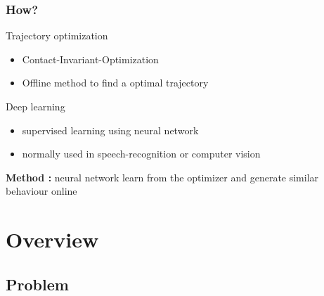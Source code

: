 \documentclass[mathserif]{beamer}
\begin{document}

\begin{frame}
  \frametitle{{How?}}
  \begin{block}{Trajectory optimization}
  \begin{itemize}
  \item Contact-Invariant-Optimization \cite{mordatch2012discovery}
  \item Offline method to find a optimal trajectory
  \end{itemize}
  
  \end{block}
  \begin{block}{Deep learning}
  \begin{itemize}
  \item supervised learning using neural network 
  \item normally used in speech-recognition or computer vision
  \end{itemize}
  \end{block}
  
  \vspace{1cm}
 \textbf{Method :} neural network learn from the optimizer and generate similar behaviour online 
  

\end{frame}



\section{Overview}
\subsection{Problem}
\end{document}

